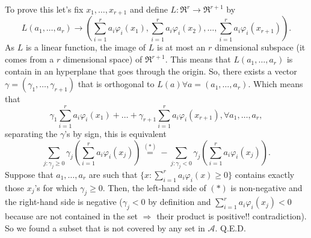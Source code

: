 \documentclass[11pt, english]{article}
\newcommand{\su}[2]{\sum\limits_{#1}^{#2}}
\begin{document}
To prove this let's fix $x_1,\dots,x_{r+1}$ and define $L:\Re^r\rightarrow\Re^{r+1}$ by 
\begin{equation}
L(a_1,\dots,a_r)\rightarrow\left(\su{i=1}{r}a_i\varphi_i(x_1),\su{i=1}{r}a_i\varphi_i(x_2),\dots,\su{i=1}{r}a_i\varphi_i(x_{r+1})\right). %
\end{equation}
As $L$ is a linear function, the image of $L$ is at most an $r$ dimensional subspace (it comes from a $r$ dimensional space) of $\Re^{r+1}$. This means that $L(a_1,\dots,a_r)$ is contain in an hyperplane that goes through the origin. So, there exists a vector $\gamma=(\gamma_1,\dots,\gamma_{r+1})$ that is orthogonal to $L(a)\forall a=(a_1,\dots,a_r)$. Which means that
\begin{equation}
	\gamma_1\su{i=1}{r}a_i\varphi_i(x_1)+\dots+\gamma_{r+1}\su{i=1}{r}a_i\varphi_i(x_{r+1}),\forall a_1,\dots,a_r,
\end{equation}
separating the $\gamma$'s by sign, this is equivalent 
\begin{equation}
	\su{j:\gamma_j\geq 0}{}\gamma_j(\su{i=1}{r}a_i\varphi_i(x_j))\overset{(*)}{=}-\su{j:\gamma_j<0}{}\gamma_j(\su{i=1}{r}a_i\varphi_i(x_j)).
\end{equation}
Suppose that $a_1,\dots,a_r$ are such that $\{x:\su{i=1}{r}a_i\varphi_i(x)\geq0\}$ contains exactly those $x_j$'s for which $\gamma_j\geq 0$. Then, the left-hand side of $(*)$ is non-negative and the right-hand side is negative ($\gamma_j<0$ by definition and $\su{i=1}{r}a_i\varphi_i(x_j)<0$ because are not contained in the set $\Rightarrow$ their product is positive!! contradiction). So we found a subset that is not covered by any set in $\mathcal{A}$. Q.E.D.\\
\end{document}
